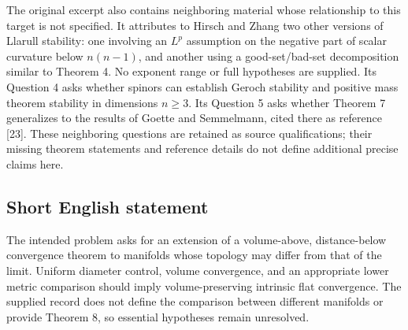 \documentclass[11pt]{article}
\begin{document}
The original excerpt also contains neighboring material whose relationship to this target is not specified. It attributes to Hirsch and Zhang two other versions of Llarull stability: one involving an \(L^p\) assumption on the negative part of scalar curvature below \(n(n-1)\), and another using a good-set/bad-set decomposition similar to Theorem 4. No exponent range or full hypotheses are supplied. Its Question 4 asks whether spinors can establish Geroch stability and positive mass theorem stability in dimensions \(n\ge3\). Its Question 5 asks whether Theorem 7 generalizes to the results of Goette and Semmelmann, cited there as reference [23]. These neighboring questions are retained as source qualifications; their missing theorem statements and reference details do not define additional precise claims here.
\subsection{Short English statement}
The intended problem asks for an extension of a volume-above, distance-below convergence theorem to manifolds whose topology may differ from that of the limit. Uniform diameter control, volume convergence, and an appropriate lower metric comparison should imply volume-preserving intrinsic flat convergence. The supplied record does not define the comparison between different manifolds or provide Theorem 8, so essential hypotheses remain unresolved.
\end{document}
